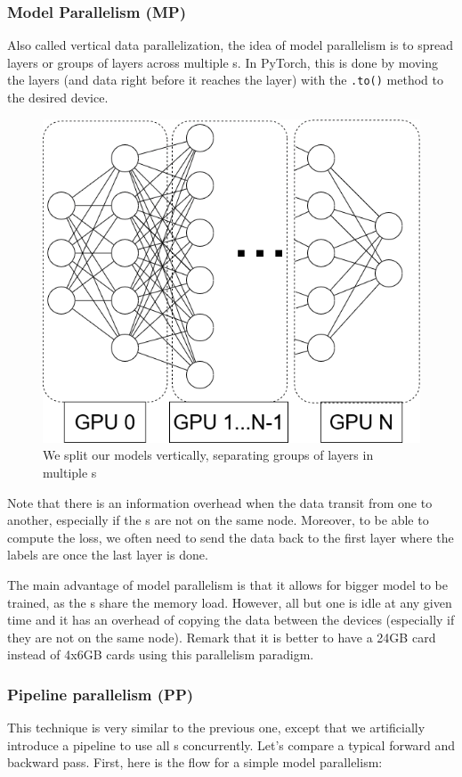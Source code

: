 \documentclass{article}
\begin{document}
\subsubsection{Model Parallelism (MP)}
Also called vertical data parallelization, the idea of model parallelism is to spread layers or groups of layers across multiple s. In PyTorch, this is done by moving the layers (and data right before it reaches the layer) with the \lstinline{.to()} method to the desired device.
\begin{figure}[h!]
  \center
  \includegraphics[width=0.5\linewidth]{images/2022-08-24-18-23-26.png}
  \caption{We split our models vertically, separating groups of layers in multiple s}
\end{figure}
\FloatBarrier
Note that there is an information overhead when the data transit from one  to another, especially if the s are not on the same node. Moreover, to be able to compute the loss, we often need to send the data back to the first layer where the labels are once the last layer is done.

The main advantage of model parallelism is that it allows for bigger model to be trained, as the s share the memory load. However, all but one  is idle at any given time and it has an overhead of copying the data between the devices (especially if they are not on the same node). Remark that it is better to have a 24GB card instead of 4x6GB cards using this parallelism paradigm.

\subsubsection{Pipeline parallelism (PP)}
This technique is very similar to the previous one, except that we artificially introduce a pipeline to use all s concurrently. Let's compare a typical forward and backward pass. First, here is the flow for a simple model parallelism:
\end{document}
